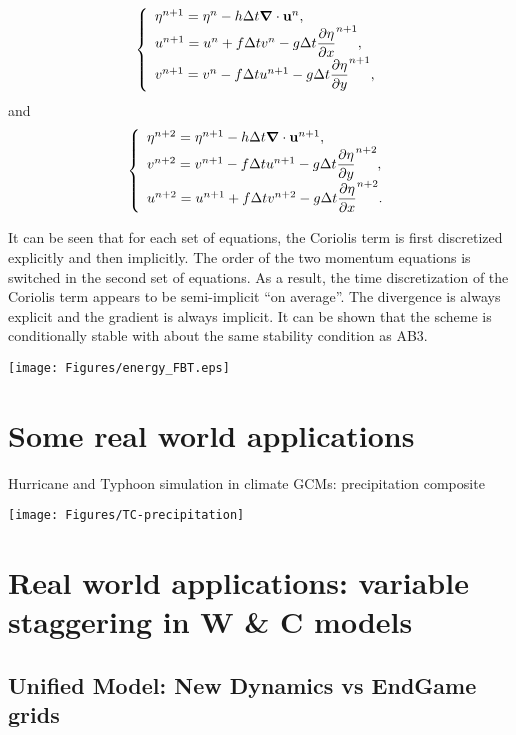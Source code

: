 \[
\left\{ \begin{array}{l}
	\eta^{n+1} = \eta^n - h \Delta t \mbox{\boldmath $\nabla$} \cdot \mathbf{u}^n,
	\\
	u^{n+1} = u^n + f \Delta t v^n - g \Delta t \displaystyle \frac{\partial \eta}{\partial x}^{n+1},
	\\
	v^{n+1} = v^n - f \Delta t u^{n+1} - g \Delta t \displaystyle \frac{\partial \eta}{\partial y}^{n+1},
\end{array} \right.
\]
and
\[
\left\{ \begin{array}{l}
	\eta^{n+2} = \eta^{n+1} - h \Delta t \mbox{\boldmath $\nabla$} \cdot \mathbf{u}^{n+1},
	\\
	v^{n+2} = v^{n+1} - f \Delta t u^{n+1} - g \Delta t \displaystyle \frac{\partial \eta}{\partial y}^{n+2},
	\\
	u^{n+2} = u^{n+1} + f \Delta t v^{n+2} - g \Delta t \displaystyle \frac{\partial \eta}{\partial x}^{n+2}.
\end{array} \right.
\]

It can be seen that for each set of equations, the Coriolis term is first discretized explicitly and then implicitly. The order of the two momentum equations is switched in the second set of equations. As a result, the time discretization of the Coriolis term appears to be semi-implicit ``on average''. The divergence is always explicit and the gradient is always implicit. It can be shown that the scheme is conditionally stable with about the same stability condition as AB3.

\begin{center}
	\texttt{[image: Figures/energy\_FBT.eps]}
\end{center}

\section{Some real world applications}
{Hurricane and Typhoon simulation in climate GCMs: precipitation composite}

\begin{center}	
	\texttt{[image: Figures/TC-precipitation]}
\end{center}


\section{Real world applications: variable staggering in W \& C models}
\subsection{Unified Model: New Dynamics vs EndGame grids} 

